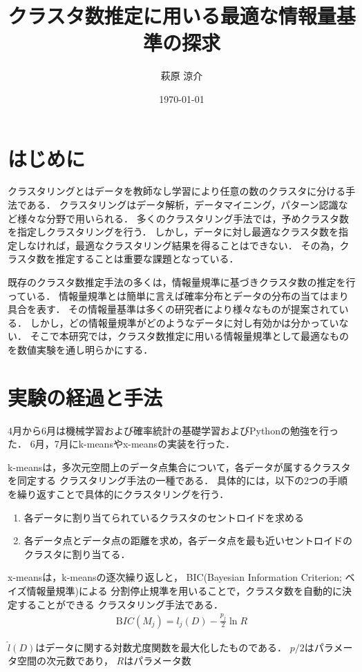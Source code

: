 \documentclass[10pt,a4j,twocolumn]{ltjsarticle}
\author{萩原 涼介}
\title{クラスタ数推定に用いる最適な情報量基準の探求}
\date{\today}
\begin{document}
\maketitle
\section{はじめに}
クラスタリングとはデータを教師なし学習により任意の数のクラスタに分ける手法である．
クラスタリングはデータ解析，データマイニング，パターン認識など様々な分野で用いられる．
多くのクラスタリング手法では，予めクラスタ数を指定しクラスタリングを行う．
しかし，データに対し最適なクラスタ数を指定しなければ，最適なクラスタリング結果を得ることはできない．
その為，クラスタ数を推定することは重要な課題となっている．

既存のクラスタ数推定手法の多くは，情報量規準に基づきクラスタ数の推定を行っている．
情報量規準とは簡単に言えば確率分布とデータの分布の当てはまり具合を表す．
その情報量基準は多くの研究者により様々なものが提案されている．
しかし，どの情報量規準がどのようなデータに対し有効かは分かっていない．
そこで本研究では，クラスタ数推定に用いる情報量規準として最適なものを数値実験を通し明らかにする．

\section{実験の経過と手法}
4月から6月は機械学習および確率統計の基礎学習およびPythonの勉強を行った．
6月，7月にk-meansやx-meansの実装を行った．

k-meansは，多次元空間上のデータ点集合について，各データが属するクラスタを同定する
クラスタリング手法の一種である．
具体的には，以下の2つの手順を繰り返すことで具体的にクラスタリングを行う．
\begin{enumerate}
  \item 各データに割り当てられているクラスタのセントロイドを求める
  \item 各データ点とデータ点の距離を求め，各データ点を最も近いセントロイドのクラスタに割り当てる．
\end{enumerate}

x-means\cite{pelleg2000x}は，k-meansの逐次繰り返しと，
BIC(Bayesian Information Criterion; ベイズ情報量規準)による
分割停止規準を用いることで，クラスタ数を自動的に決定することができる
クラスタリング手法である．
\begin{align}
  \label{eq:bic}
  {\mathrm BIC}(M_j) = \hat{l_j}(D) - \frac{p_j}{2}\ln R
\end{align}

$\hat{l}(D)$はデータに関する対数尤度関数を最大化したものである．
$p/2$はパラメータ空間の次元数であり，
$R$はパラメータ数
\end{document}
